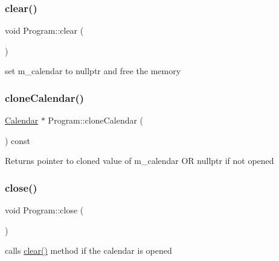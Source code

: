 \subsubsection{\texorpdfstring{clear()}{clear()}}
{\footnotesize\ttfamily void Program\+::clear (\begin{DoxyParamCaption}{ }\end{DoxyParamCaption})\hspace{0.3cm}{\ttfamily [private]}}



set m\+\_\+calendar to nullptr and free the memory 

\mbox{\label{classProgram_ae2bc41544b2cedf95611867ead89d6c9}} 
\subsubsection{\texorpdfstring{clone\+Calendar()}{cloneCalendar()}}
{\footnotesize\ttfamily \hyperlink{classCalendar}{Calendar} $\ast$ Program\+::clone\+Calendar (\begin{DoxyParamCaption}{ }\end{DoxyParamCaption}) const}

\begin{DoxyReturn}{Returns}
pointer to cloned value of m\+\_\+calendar OR nullptr if not opened 
\end{DoxyReturn}
\mbox{\label{classProgram_ab8b7a28d1be3f1b8c5136e936c75ca63}} 
\subsubsection{\texorpdfstring{close()}{close()}}
{\footnotesize\ttfamily void Program\+::close (\begin{DoxyParamCaption}{ }\end{DoxyParamCaption})}



calls \hyperlink{classProgram_a6fd6135c7adf5af67b55a2303d95defe}{clear()} method if the calendar is opened 

\mbox{\label{classProgram_a639a0af6603bda2f6dc8ec051fd1dd93}} 
